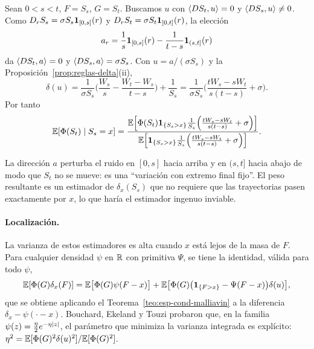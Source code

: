 \begin{ejemplo}\label{ej:esp-cond-bs}
Sean $0<s<t$, $F=S_s$, $G=S_t$. Buscamos $u$ con $\left\langle DS_t, u\right\rangle=0$
y $\left\langle DS_s, u\right\rangle\ne0$. Como $D_rS_s=\sigma S_s\mathbf{1}_{[0,s]}(r)$ y $D_rS_t=\sigma S_t\mathbf{1}_{[0,t]}(r)$, la elección
\[
  a_r=\frac1s\mathbf{1}_{[0,s]}(r)-\frac1{t-s}\mathbf{1}_{(s,t]}(r)
\]
da $\left\langle DS_t, a\right\rangle=0$ y $\left\langle DS_s, a\right\rangle=\sigma S_s$. Con $u=a/(\sigma S_s)$ y la Proposición~\ref{prop:reglas-delta}(ii),
\[
  \delta(u)=\frac1{\sigma S_s}\Big(\frac{W_s}{s}-\frac{W_t-W_s}{t-s}\Big)+\frac1{S_s}=\frac1{\sigma S_s}\Big(\frac{tW_s-sW_t}{s(t-s)}+\sigma\Big).
\]
Por tanto
\[
  \mathbb{E}[\Phi(S_t)\mid S_s=x]=\frac{\mathbb{E}\Big[\Phi(S_t)\mathbf{1}_{\{S_s>x\}}\frac1{S_s}\Big(\frac{tW_s-sW_t}{s(t-s)}+\sigma\Big)\Big]}{\mathbb{E}\Big[\mathbf{1}_{\{S_s>x\}}\frac1{S_s}\Big(\frac{tW_s-sW_t}{s(t-s)}+\sigma\Big)\Big]}.
\]
\end{ejemplo}

\begin{intuicion}
La dirección $a$ perturba el ruido en $[0,s]$ hacia arriba y en $(s,t]$ hacia abajo de modo
que $S_t$ no se mueve: es una ``variación con extremo final fijo''. El peso resultante es un
estimador de $\delta_x(S_s)$ que no requiere que las trayectorias pasen exactamente por $x$, lo que
haría el estimador ingenuo inviable.
\end{intuicion}

\paragraph{Localización.} La varianza de estos estimadores es alta cuando $x$ está lejos de la masa de $F$.
Para cualquier densidad $\psi$ en $\mathbb{R}$ con primitiva $\Psi$, se tiene la identidad, válida para todo $\psi$,
\[
  \mathbb{E}[\Phi(G)\delta_x(F)]=\mathbb{E}\big[\Phi(G)\psi(F-x)\big]+\mathbb{E}\big[\Phi(G)\big(\mathbf{1}_{\{F>x\}}-\Psi(F-x)\big)\delta(u)\big],
\]
que se obtiene aplicando el Teorema~\ref{teo:esp-cond-malliavin} a la diferencia $\delta_x-\psi(\cdot-x)$. Bouchard, Ekeland
y Touzi probaron que, en la familia $\psi(z)=\frac\eta2e^{-\eta\left\lvert z\right\rvert}$, el parámetro que minimiza la varianza
integrada es explícito: $\eta^2=\mathbb{E}[\Phi(G)^2\delta(u)^2]/\mathbb{E}[\Phi(G)^2]$.

